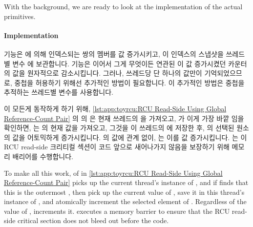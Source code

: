 With the background, we are ready to look at the implementation of the
actual primitives.

\fi

\paragraph{Implementation}

 기능은  에 의해 인덱스되는 
쌍의 멤버를 값 증가시키고, 이 인덱스의 스냅샷을 쓰레드별 변수 
에 보관합니다.
 기능은 이어서 그게 무엇이든 연관된 
이 값 증가시켰던 카운터의 값을 원자적으로 감소시킵니다.
그러나, 쓰레드당 단 하나의  값만이 기억되었으므로, 중첩을 허용하기
위해선 추가적인 방법이 필요합니다.
이 추가적인 방법은 중첩을 추적하는 쓰레드별  변수를 사용합니다.

\iffalse

The \co{rcu_read_lock()} primitive atomically increments the member of the
\co{rcu_refcnt[]} pair indexed by \co{rcu_idx}, and keeps a
snapshot of this index in the per-thread variable \co{rcu_read_idx}.
The \co{rcu_read_unlock()} primitive then atomically decrements
whichever counter of the pair that the corresponding \co{rcu_read_lock()}
incremented.
However, because only one value of \co{rcu_idx} is remembered per thread,
additional measures must be taken to permit nesting.
These additional measures use the per-thread \co{rcu_nesting} variable
to track nesting.

\fi

\begin{fcvref}
이 모든게 동작하게 하기 위해,
\cref{lst:app:toyrcu:RCU Read-Side Using Global Reference-Count Pair} 의
 의  은 현재 쓰레드의  을
가져오고,  가 이게 가장 바깥  임을 확인하면,
 는  의 현재 값을 가져오고, 그것을 이
쓰레드의  에 저장한 후,  의 선택된 원소의 값을
어토믹하게 증가시킵니다.
 의 값에 관계 없이,  는 이를 값 증가시킵니다.
 는 이 RCU read-side 크리티컬 섹션이  코드
앞으로 새어나가지 않음을 보장하기 위해 메모리 배리어를 수행합니다.
\end{fcvref}

\iffalse

\begin{fcvref}
To make all this work,  of  in
\cref{lst:app:toyrcu:RCU Read-Side Using Global Reference-Count Pair}
picks up the
current thread's instance of , and if  finds
that this is the outermost ,
then  pick up the current value of
, save it in this thread's instance of ,
and atomically increment the selected element of .
Regardless of the value of ,  increments it.
 executes a memory barrier to ensure that the RCU read-side
critical section does not bleed out before the  code.
\end{fcvref}

